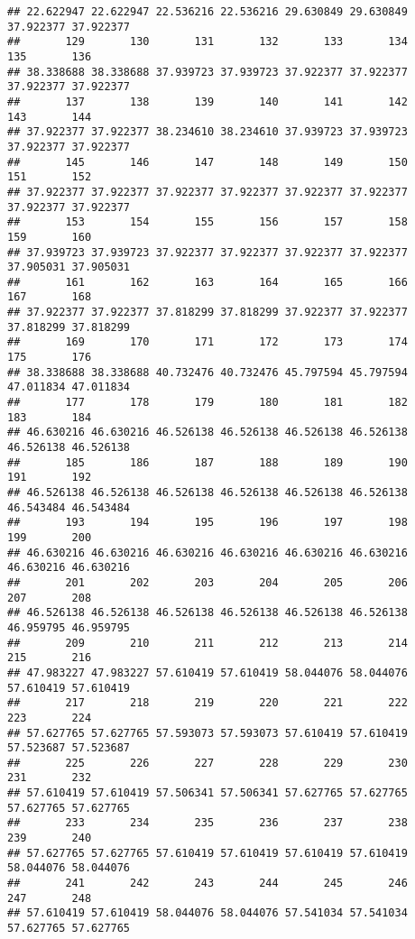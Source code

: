 \documentclass[
]{article}
\begin{document}
\begin{verbatim}
## 22.622947 22.622947 22.536216 22.536216 29.630849 29.630849 37.922377 37.922377 
##       129       130       131       132       133       134       135       136 
## 38.338688 38.338688 37.939723 37.939723 37.922377 37.922377 37.922377 37.922377 
##       137       138       139       140       141       142       143       144 
## 37.922377 37.922377 38.234610 38.234610 37.939723 37.939723 37.922377 37.922377 
##       145       146       147       148       149       150       151       152 
## 37.922377 37.922377 37.922377 37.922377 37.922377 37.922377 37.922377 37.922377 
##       153       154       155       156       157       158       159       160 
## 37.939723 37.939723 37.922377 37.922377 37.922377 37.922377 37.905031 37.905031 
##       161       162       163       164       165       166       167       168 
## 37.922377 37.922377 37.818299 37.818299 37.922377 37.922377 37.818299 37.818299 
##       169       170       171       172       173       174       175       176 
## 38.338688 38.338688 40.732476 40.732476 45.797594 45.797594 47.011834 47.011834 
##       177       178       179       180       181       182       183       184 
## 46.630216 46.630216 46.526138 46.526138 46.526138 46.526138 46.526138 46.526138 
##       185       186       187       188       189       190       191       192 
## 46.526138 46.526138 46.526138 46.526138 46.526138 46.526138 46.543484 46.543484 
##       193       194       195       196       197       198       199       200 
## 46.630216 46.630216 46.630216 46.630216 46.630216 46.630216 46.630216 46.630216 
##       201       202       203       204       205       206       207       208 
## 46.526138 46.526138 46.526138 46.526138 46.526138 46.526138 46.959795 46.959795 
##       209       210       211       212       213       214       215       216 
## 47.983227 47.983227 57.610419 57.610419 58.044076 58.044076 57.610419 57.610419 
##       217       218       219       220       221       222       223       224 
## 57.627765 57.627765 57.593073 57.593073 57.610419 57.610419 57.523687 57.523687 
##       225       226       227       228       229       230       231       232 
## 57.610419 57.610419 57.506341 57.506341 57.627765 57.627765 57.627765 57.627765 
##       233       234       235       236       237       238       239       240 
## 57.627765 57.627765 57.610419 57.610419 57.610419 57.610419 58.044076 58.044076 
##       241       242       243       244       245       246       247       248 
## 57.610419 57.610419 58.044076 58.044076 57.541034 57.541034 57.627765 57.627765 

\end{verbatim}
\end{document}
